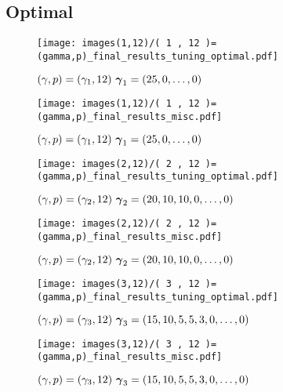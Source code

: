 \documentclass[main.tex]{subfiles}
\begin{document}




\subsection{Optimal}
\begin{figure}[H]
    \centering
    \texttt{[image: images(1,12)/( 1 , 12 )=(gamma,p)\_final\_results\_tuning\_optimal.pdf]}
    \caption{$(\gamma, p) = (\gamma_1, 12) \ \gammaone$}
    \label{fig:optimal1-12}
\end{figure}

\begin{figure}[H]
    \centering
    \texttt{[image: images(1,12)/( 1 , 12 )=(gamma,p)\_final\_results\_misc.pdf]}
    \caption{$(\gamma, p) = (\gamma_1, 12) \ \gammaone$}
    \label{fig:misc1-12}
\end{figure}

\begin{figure}[H]
    \centering
    \texttt{[image: images(2,12)/( 2 , 12 )=(gamma,p)\_final\_results\_tuning\_optimal.pdf]}
    \caption{$(\gamma, p) = (\gamma_2, 12) \ \gammatwo$}
    \label{fig:optimal2-12}
\end{figure}

\begin{figure}[H]
    \centering
    \texttt{[image: images(2,12)/( 2 , 12 )=(gamma,p)\_final\_results\_misc.pdf]}
    \caption{$(\gamma, p) = (\gamma_2, 12) \ \gammatwo$}
    \label{fig:misc2-12}
\end{figure}

\begin{figure}[H]
    \centering
    \texttt{[image: images(3,12)/( 3 , 12 )=(gamma,p)\_final\_results\_tuning\_optimal.pdf]}
    \caption{$(\gamma, p) = (\gamma_3, 12) \ \gammathree$}
    \label{fig:optimal3-12}
\end{figure}

\begin{figure}[H]
    \centering
    \texttt{[image: images(3,12)/( 3 , 12 )=(gamma,p)\_final\_results\_misc.pdf]}
    \caption{$(\gamma, p) = (\gamma_3, 12) \ \gammathree$}
    \label{fig:misc3-12}
\end{figure}


\end{document}
